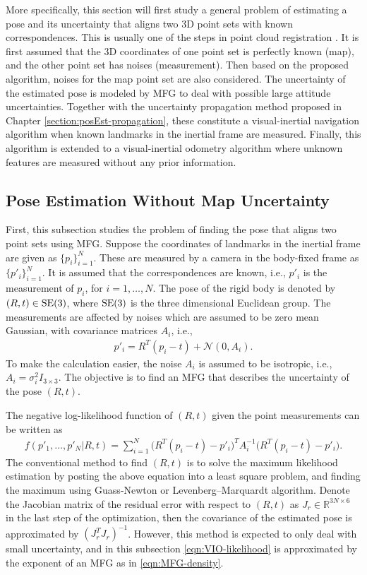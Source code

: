 More specifically, this section will first study a general problem of estimating a pose and its uncertainty that aligns two 3D point sets with known correspondences.
This is usually one of the steps in point cloud registration \cite{huang2021comprehensive}.
It is first assumed that the 3D coordinates of one point set is perfectly known (map), and the other point set has noises (measurement).
Then based on the proposed algorithm, noises for the map point set are also considered.
The uncertainty of the estimated pose is modeled by MFG to deal with possible large attitude uncertainties.
Together with the uncertainty propagation method proposed in Chapter \ref{section:posEst-propagation}, these constitute a visual-inertial navigation algorithm when known landmarks in the inertial frame are measured.
Finally, this algorithm is extended to a visual-inertial odometry algorithm where unknown features are measured without any prior information.

\subsection{Pose Estimation Without Map Uncertainty}

First, this subsection studies the problem of finding the pose that aligns two point sets using MFG.
Suppose the coordinates of landmarks in the inertial frame are given as $\{p_i\}_{i=1}^N$.
These are measured by a camera in the body-fixed frame as $\{p'_i\}_{i=1}^N$.
It is assumed that the correspondences are known, i.e., $p'_i$ is the measurement of $p_i$, for $i = 1,\ldots,N$.
The pose of the rigid body is denoted by $(R,t)\in\mathrm{SE}(3)$, where $\mathrm{SE}(3)$ is the three dimensional Euclidean group.
The measurements are affected by noises which are assumed to be zero mean Gaussian, with covariance matrices $A_i$, i.e.,
\begin{align}
	p'_i = R^T(p_i-t) + \mathcal{N}(0,A_i).
\end{align}
To make the calculation easier, the noise $A_i$ is assumed to be isotropic, i.e., $A_i = \sigma_i^2I_{3\times 3}$.
The objective is to find an MFG that describes the uncertainty of the pose $(R,t)$.

The negative log-likelihood function of $(R,t)$ given the point measurements can be written as
\begin{align} \label{eqn:VIO-likelihood}
	f(p'_1,\ldots,p'_N | R,t) = \sum_{i=1}^N \big(R^T(p_i-t)-p'_i\big)^T A_i^{-1} \big(R^T(p_i-t)-p'_i\big).
\end{align}
The conventional method to find $(R,t)$ is to solve the maximum likelihood estimation by posting the above equation into a least square problem, and finding the maximum using Guass-Newton or Levenberg–Marquardt algorithm.
Denote the Jacobian matrix of the residual error with respect to $(R,t)$ as $J_r\in\mathbb{R}^{3N\times 6}$ in the last step of the optimization, then the covariance of the estimated pose is approximated by $(J_r^TJ_r)^{-1}$.
However, this method is expected to only deal with small uncertainty, and in this subsection \eqref{eqn:VIO-likelihood} is approximated by the exponent of an MFG as in \eqref{eqn:MFG-density}.

